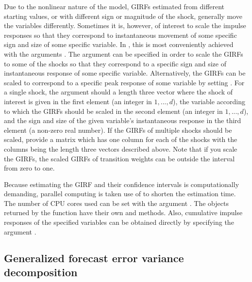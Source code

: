 \documentclass[nojss]{jss}
\begin{document}
Due to the nonlinear nature of the model, GIRFs estimated from different starting values, or with different sign or magnitude of the shock, generally move the variables differently. Sometimes it is, however, of interest to scale the impulse responses so that they correspond to instantaneous movement of some specific sign and size of some specific variable. In , this is most conveniently achieved with the arguments . The argument  can be specified in order to scale the GIRFs to some of the shocks so that they correspond to a specific sign and size of instantaneous response of some specific variable. Alternatively, the GIRFs can be scaled to correspond to a specific peak response of some variable by setting . For a single shock, the argument  should a length three vector where the shock of interest is given in the first element (an integer in $1,...,d$), the variable according to which the GIRFs should be scaled in the second element (an integer in $1,...,d$), and the sign and size of the given variable's instantaneous response in the third element (a non-zero real number). If the GIRFs of multiple shocks should be scaled, provide a matrix which has one column for each of the shocks with the columns being the length three vectors described above. Note that if you scale the GIRFs, the scaled GIRFs of transition weights can be outside the interval from zero to one.

Because estimating the GIRF and their confidence intervals is computationally demanding, parallel computing is taken use of to shorten the estimation time. The number of CPU cores used can be set with the argument . The objects returned by the  function have their own  and  methods. Also, cumulative impulse responses of the specified variables can be obtained directly by specifying the argument .


\subsection{Generalized forecast error variance decomposition}
\end{document}
